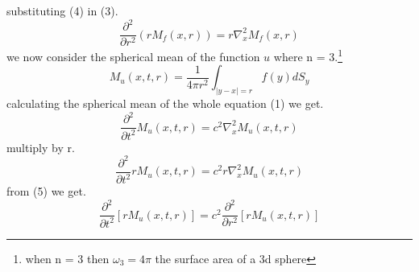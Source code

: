 \documentclass[]{article}
\begin{document}
substituting (4) in (3).
\begin{equation}
\frac{\partial^2 }{\partial r^2}\left(rM_f (x,r) \right) = r\nabla_{x}^{2} M_f (x,r)
\end{equation}
we now consider the spherical mean of the function $u$ where n = 3.\footnote{when n = 3 then $\omega_3 = 4\pi$ the surface area of a 3d sphere}
\[
    M_{u}(x,t,r) = \frac{1}{4\pi r^2} \int_{|y-x|=r} f(y)dS_y    
\]
calculating the spherical mean of the whole equation (1) we get.
\[
    \frac{\partial^2}{\partial t^2} M_{u}(x,t,r) = c^2 \nabla_{x}^{2}M_{u}(x,t,r)    
\]
multiply by r.
\[
    \frac{\partial^2}{\partial t^2} r M_{u}(x,t,r) = c^2 r\nabla_{x}^{2}M_{u}(x,t,r)    
\]
from (5) we get.
\begin{equation}
    \frac{\partial^2}{\partial t^2} \left[r M_u (x,t,r) \right] = c^2 \frac{\partial^2 }{\partial r^2}\left[r M_u (x,t,r) \right]    
\end{equation}

\newpage 
\end{document}
